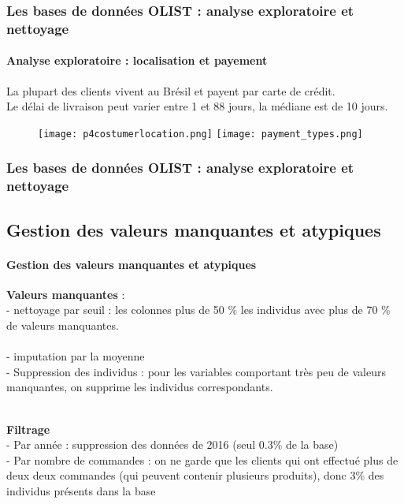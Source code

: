 \documentclass{beamer}
\begin{document}
\begin{frame}

\frametitle{Les bases de données OLIST : analyse exploratoire et nettoyage}
	\framesubtitle{Analyse exploratoire : localisation et payement}
 \begin{footnotesize}
La plupart des clients vivent au Brésil et payent par carte de crédit. \\
Le délai de livraison peut varier entre 1 et 88 jours, la médiane est de 10 jours. 
\end{footnotesize}
\begin{figure}
    \texttt{[image: p4costumerlocation.png]} 
    \texttt{[image: payment\_types.png]} 
\end{figure}

\end{frame}

\begin{frame}
    \frametitle{Les bases de données OLIST : analyse exploratoire et nettoyage}
    \subsection{Gestion des valeurs manquantes et atypiques}
    \framesubtitle{Gestion des valeurs manquantes et atypiques}
\begin{footnotesize}
\textbf{Valeurs manquantes} : \\

- nettoyage par seuil : les colonnes plus de 50 \%  les individus avec  plus de 70 \% de valeurs manquantes.\\ \\  

- imputation par la moyenne \\

- Suppression des individus : pour les variables comportant très peu de valeurs manquantes, on supprime les individus correspondants.\\ 

 \\
\newline

\textbf{Filtrage} \\ 
- Par année : suppression des données de 2016 (seul  0.3\% de la base)  \\
- Par nombre de commandes : on ne garde que les clients qui ont effectué plus de deux
deux commandes (qui peuvent contenir plusieurs produits), donc 3\% des individus présents dans la base\\
\end{footnotesize}
\end{frame}
\end{document}
